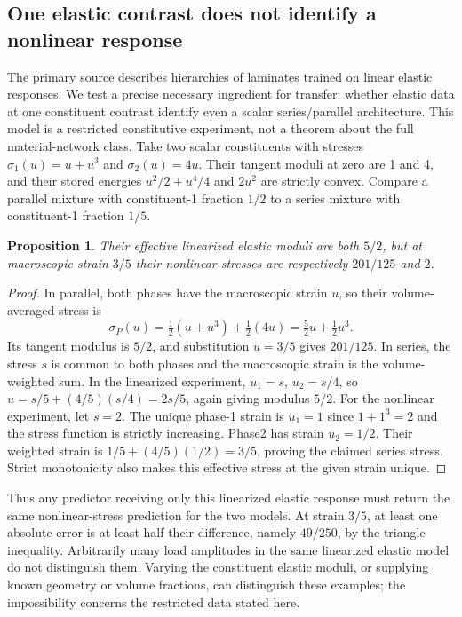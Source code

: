 \documentclass[11pt]{article}
\newtheorem{proposition}{Proposition}
\begin{document}
\subsection{One elastic contrast does not identify a nonlinear response}
The primary source describes hierarchies of laminates trained on linear elastic responses. We test a precise necessary ingredient for transfer: whether elastic data at one constituent contrast identify even a scalar series/parallel architecture. This model is a restricted constitutive experiment, not a theorem about the full material-network class.
Take two scalar constituents with stresses $\sigma_1(u)=u+u^3$ and $\sigma_2(u)=4u$. Their tangent moduli at zero are 1 and 4, and their stored energies $u^2/2+u^4/4$ and $2u^2$ are strictly convex. Compare a parallel mixture with constituent-1 fraction $1/2$ to a series mixture with constituent-1 fraction $1/5$.
\begin{proposition}
Their effective linearized elastic moduli are both $5/2$, but at macroscopic strain $3/5$ their nonlinear stresses are respectively $201/125$ and $2$.
\end{proposition}
\begin{proof}
In parallel, both phases have the macroscopic strain $u$, so their volume-averaged stress is
\[
\sigma_P(u)=\tfrac12(u+u^3)+\tfrac12(4u)=\tfrac52u+\tfrac12u^3.
\]
Its tangent modulus is $5/2$, and substitution $u=3/5$ gives $201/125$.
In series, the stress $s$ is common to both phases and the macroscopic strain is the volume-weighted sum. In the linearized experiment, $u_1=s$, $u_2=s/4$, so $u=s/5+(4/5)(s/4)=2s/5$, again giving modulus $5/2$. For the nonlinear experiment, let $s=2$. The unique phase-1 strain is $u_1=1$ since $1+1^3=2$ and the stress function is strictly increasing. Phase2 has strain $u_2=1/2$. Their weighted strain is $1/5+(4/5)(1/2)=3/5$, proving the claimed series stress. Strict monotonicity also makes this effective stress at the given strain unique.
\end{proof}
Thus any predictor receiving only this linearized elastic response must return the same nonlinear-stress prediction for the two models. At strain $3/5$, at least one absolute error is at least half their difference, namely $49/250$, by the triangle inequality. Arbitrarily many load amplitudes in the same linearized elastic model do not distinguish them. Varying the constituent elastic moduli, or supplying known geometry or volume fractions, can distinguish these examples; the impossibility concerns the restricted data stated here.
\end{document}
